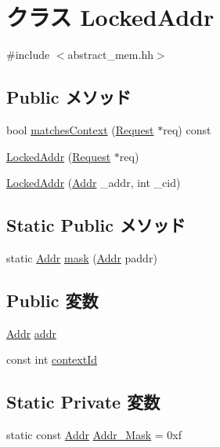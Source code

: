 \hypertarget{classLockedAddr}{
\section{クラス LockedAddr}
\label{classLockedAddr}
}


{\ttfamily \#include $<$abstract\_\-mem.hh$>$}\subsection*{Public メソッド}
\begin{DoxyCompactItemize}
\item 
bool \hyperlink{classLockedAddr_a9c8aa9df464f2067efb9cf2aeeb2a5c0}{matchesContext} (\hyperlink{classRequest}{Request} $\ast$req) const 
\item 
\hyperlink{classLockedAddr_a4a46255d3609634bae77118998fc49c6}{LockedAddr} (\hyperlink{classRequest}{Request} $\ast$req)
\item 
\hyperlink{classLockedAddr_af218a9f6d520788d30200f2dfdbdd2fc}{LockedAddr} (\hyperlink{base_2types_8hh_af1bb03d6a4ee096394a6749f0a169232}{Addr} \_\-addr, int \_\-cid)
\end{DoxyCompactItemize}
\subsection*{Static Public メソッド}
\begin{DoxyCompactItemize}
\item 
static \hyperlink{base_2types_8hh_af1bb03d6a4ee096394a6749f0a169232}{Addr} \hyperlink{classLockedAddr_a9b993266e635c8e28d2bc0a5123351b1}{mask} (\hyperlink{base_2types_8hh_af1bb03d6a4ee096394a6749f0a169232}{Addr} paddr)
\end{DoxyCompactItemize}
\subsection*{Public 変数}
\begin{DoxyCompactItemize}
\item 
\hyperlink{base_2types_8hh_af1bb03d6a4ee096394a6749f0a169232}{Addr} \hyperlink{classLockedAddr_a0bb77b4ba61e408313e1118250f9278c}{addr}
\item 
const int \hyperlink{classLockedAddr_a4ec643fb866cd5b538447f3a670c1d27}{contextId}
\end{DoxyCompactItemize}
\subsection*{Static Private 変数}
\begin{DoxyCompactItemize}
\item 
static const \hyperlink{base_2types_8hh_af1bb03d6a4ee096394a6749f0a169232}{Addr} \hyperlink{classLockedAddr_a27195273cc64bf014d6a9273a2eabd78}{Addr\_\-Mask} = 0xf
\end{DoxyCompactItemize}


